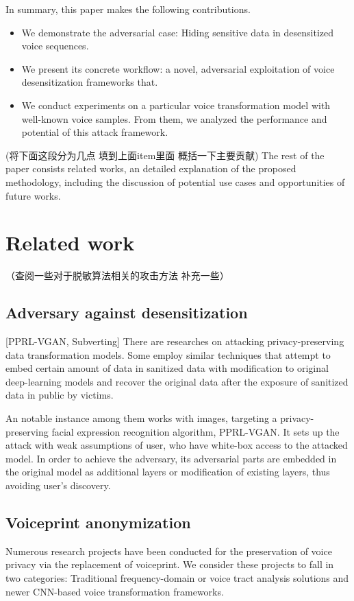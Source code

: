 \documentclass[journal]{IEEEtran} %
\begin{document}
\begin{CJK*}{UTF8}{gbsn}
In summary, this paper makes the following contributions.

\begin{itemize}

\item We demonstrate the adversarial case: Hiding sensitive data in desensitized voice sequences.

\item We present its concrete workflow: a novel, adversarial exploitation of voice desensitization frameworks that.

\item We conduct experiments on a particular voice transformation model with well-known voice samples. From them, we analyzed the performance and potential of this attack framework.

\end{itemize}
(将下面这段分为几点 填到上面item里面 概括一下主要贡献)
The rest of the paper consists related works, an detailed explanation of the proposed methodology, including the discussion of potential use cases and opportunities of future works.

\section{Related work}
（查阅一些对于脱敏算法相关的攻击方法 补充一些）
\subsection{Adversary against desensitization}

[PPRL-VGAN, Subverting]
There are researches on attacking privacy-preserving data transformation models. Some employ similar techniques that attempt to embed certain amount of data in sanitized data with modification to original deep-learning models and recover the original data after the exposure of sanitized data in public by victims. 

An notable instance among them works with images, targeting a privacy-preserving facial expression recognition algorithm, PPRL-VGAN. It sets up the attack with weak assumptions of user, who have white-box access to the attacked model. In order to achieve the adversary, its adversarial parts are embedded in the original model as additional layers or modification of existing layers, thus avoiding user's discovery.

\subsection{Voiceprint anonymization}
Numerous research projects have been conducted for the preservation of voice privacy via the replacement of voiceprint. We consider these projects to fall in two categories: Traditional frequency-domain or voice tract analysis solutions and newer CNN-based voice transformation frameworks. 


\end{CJK*}
\end{document}
